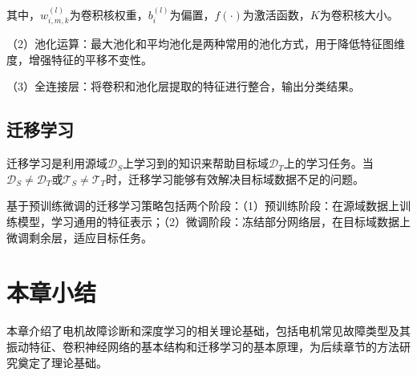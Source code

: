 其中，$w_{i,m,k}^{(l)}$为卷积核权重，$b_i^{(l)}$为偏置，$f(\cdot)$为激活函数，$K$为卷积核大小。

（2）池化运算：最大池化和平均池化是两种常用的池化方式，用于降低特征图维度，增强特征的平移不变性。

（3）全连接层：将卷积和池化层提取的特征进行整合，输出分类结果。

\subsection{迁移学习}

迁移学习是利用源域$\mathcal{D}_S$上学习到的知识来帮助目标域$\mathcal{D}_T$上的学习任务。当$\mathcal{D}_S \neq \mathcal{D}_T$或$\mathcal{T}_S \neq \mathcal{T}_T$时，迁移学习能够有效解决目标域数据不足的问题。

基于预训练微调的迁移学习策略包括两个阶段：（1）预训练阶段：在源域数据上训练模型，学习通用的特征表示；（2）微调阶段：冻结部分网络层，在目标域数据上微调剩余层，适应目标任务。

\section{本章小结}

本章介绍了电机故障诊断和深度学习的相关理论基础，包括电机常见故障类型及其振动特征、卷积神经网络的基本结构和迁移学习的基本原理，为后续章节的方法研究奠定了理论基础。